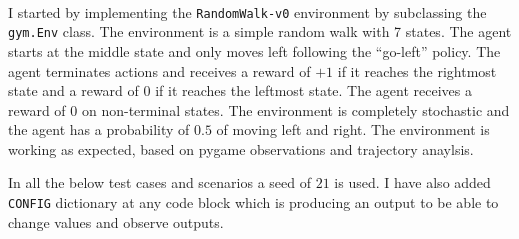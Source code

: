 \\

\noindent I started by implementing the \texttt{RandomWalk-v0} environment by subclassing the \texttt{gym.Env} class. The environment is a simple random walk with 7 states. The agent starts at the middle state and only moves left following the ``go-left'' policy. The agent terminates actions and receives a reward of $+1$ if it reaches the rightmost state and a reward of $0$ if it reaches the leftmost state. The agent receives a reward of $0$ on non-terminal states. The environment is completely stochastic and the agent has a probability of $0.5$ of moving left and right. The environment is working as expected, based on pygame observations and trajectory anaylsis.

In all the below test cases and scenarios a seed of $21$ is used. I have also added \texttt{CONFIG} dictionary at any code block which is producing an output to be able to change values and observe outputs.
